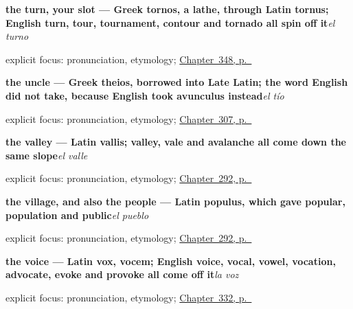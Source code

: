 \noindent\begin{minipage}[t]{\linewidth}
\raggedright
\textbf{the turn, your slot — Greek tornos, a lathe, through Latin tornus; English turn, tour, tournament, contour and tornado all spin off it}\enspace\emph{el turno}\par
\footnotesize explicit focus: pronunciation, etymology; \hyperref[ch:el-principio-y-el-fin]{Chapter~348, p.~\pageref*{ch:el-principio-y-el-fin}}
\end{minipage}\par\smallskip

\noindent\begin{minipage}[t]{\linewidth}
\raggedright
\textbf{the uncle --- Greek theios, borrowed into Late Latin; the word English did not take, because English took avunculus instead}\enspace\emph{el tío}\par
\footnotesize explicit focus: pronunciation, etymology; \hyperref[ch:esposos-y-tios]{Chapter~307, p.~\pageref*{ch:esposos-y-tios}}
\end{minipage}\par\smallskip

\noindent\begin{minipage}[t]{\linewidth}
\raggedright
\textbf{the valley — Latin vallis; valley, vale and avalanche all come down the same slope}\enspace\emph{el valle}\par
\footnotesize explicit focus: pronunciation, etymology; \hyperref[ch:la-tierra]{Chapter~292, p.~\pageref*{ch:la-tierra}}
\end{minipage}\par\smallskip

\noindent\begin{minipage}[t]{\linewidth}
\raggedright
\textbf{the village, and also the people — Latin populus, which gave popular, population and public}\enspace\emph{el pueblo}\par
\footnotesize explicit focus: pronunciation, etymology; \hyperref[ch:la-tierra]{Chapter~292, p.~\pageref*{ch:la-tierra}}
\end{minipage}\par\smallskip

\noindent\begin{minipage}[t]{\linewidth}
\raggedright
\textbf{the voice — Latin vox, vocem; English voice, vocal, vowel, vocation, advocate, evoke and provoke all come off it}\enspace\emph{la voz}\par
\footnotesize explicit focus: pronunciation, etymology; \hyperref[ch:permiso-y-voz]{Chapter~332, p.~\pageref*{ch:permiso-y-voz}}
\end{minipage}\par\smallskip

